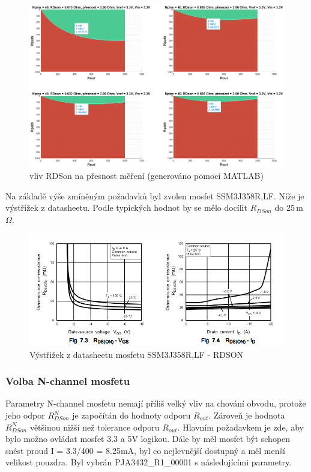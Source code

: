 \begin{figure}[ht!]
\centering
\includegraphics[width = 1\textwidth]{obrazky/vliv_RDSON.eps}
\caption{vliv RDSon na přesnost měření (generováno pomocí MATLAB)}
\label{fig:vliv RDSon}
\end{figure}

Na základě výše zmíněným požadavků byl zvolen mosfet SSM3J358R,LF. Níže je výstřižek z datasheetu.
Podle typických hodnot by se mělo
docílit $R_{DSon}$ do 25\,m$\Omega$.
\begin{figure}[ht!]
\centering
\includegraphics[height = 0.15\textheight]{obrazky/mosfet_datasheet.png}
\caption{Výstřižek z datasheetu mosfetu SSM3J358R,LF - RDSON\cite{PMOS_datasheet}}
\label{fig:Výstřižek z datasheetu mosfetu SSM3J358R,LF - RDSON}
\end{figure}

\clearpage

\subsubsection{Volba N-channel mosfetu}
Parametry N-channel mosfetu nemají příliš velký vliv na chování obvodu, protože jeho odpor $R^N_{DSon}$ je započítán do hodnoty odporu $R_{out}$.
Zároveň je hodnota $R^N_{DSon}$ většinou nižší než tolerance odporu $R_{out}$. Hlavním požadavkem je zde, aby bylo možno ovládat mosfet 3.3 a 5V logikou.
Dále by měl mosfet být schopen snést proud I = 3.3/400 = 8.25mA, byl co nejlevnější dostupný a měl menší velikost pouzdra. Byl vybrán PJA3432\_R1\_00001
s následujícími parametry.\par

